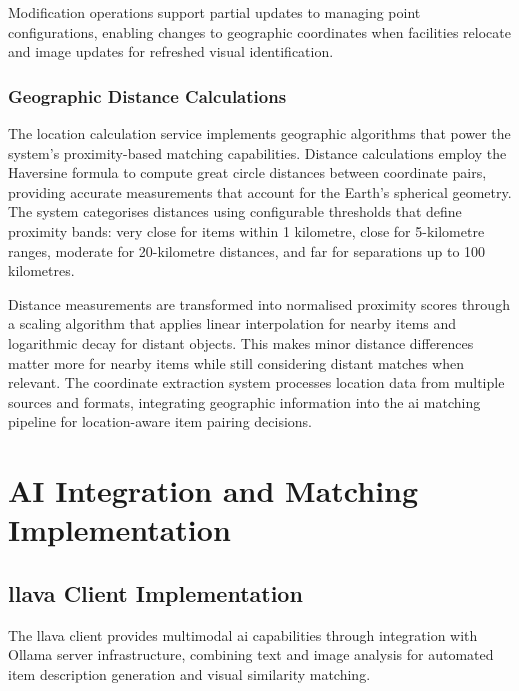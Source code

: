Modification operations support partial updates to managing point configurations, enabling changes to geographic coordinates when facilities relocate and image updates for refreshed visual identification.

\subsubsection{Geographic Distance Calculations}

The location calculation service implements geographic algorithms that power the system's proximity-based matching capabilities. Distance calculations employ the Haversine formula \cite{Sinnott1984} to compute great circle distances between coordinate pairs, providing accurate measurements that account for the Earth's spherical geometry. The system categorises distances using configurable thresholds that define proximity bands: very close for items within 1 kilometre, close for 5-kilometre ranges, moderate for 20-kilometre distances, and far for separations up to 100 kilometres.

Distance measurements are transformed into normalised proximity scores through a scaling algorithm that applies linear interpolation for nearby items and logarithmic decay for distant objects. This makes minor distance differences matter more for nearby items while still considering distant matches when relevant. The coordinate extraction system processes location data from multiple sources and formats, integrating geographic information into the \ac{ai} matching pipeline for location-aware item pairing decisions.



\section{AI Integration and Matching Implementation} \label{section:ai_integration}

\subsection{\ac{llava} Client Implementation} \label{subsection:llava_client}

The \ac{llava} client provides multimodal \ac{ai} capabilities through integration with Ollama server infrastructure, combining text and image analysis for automated item description generation and visual similarity matching.

